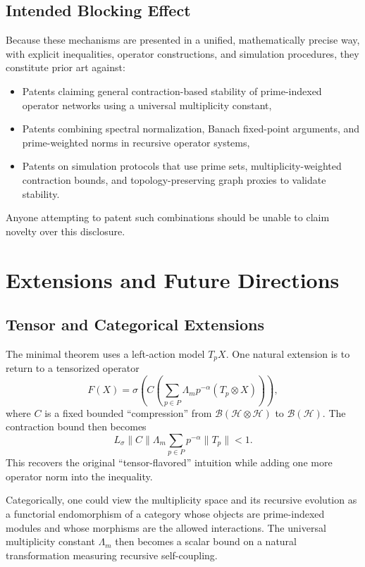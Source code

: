 \documentclass[12pt]{article}
\begin{document}
\subsection{Intended Blocking Effect}

Because these mechanisms are presented in a unified, mathematically precise way, with explicit inequalities, operator constructions, and simulation procedures, they constitute prior art against:

\begin{itemize}
  \item Patents claiming general contraction-based stability of prime-indexed operator networks using a universal multiplicity constant,
  \item Patents combining spectral normalization, Banach fixed-point arguments, and prime-weighted norms in recursive operator systems,
  \item Patents on simulation protocols that use prime sets, multiplicity-weighted contraction bounds, and topology-preserving graph proxies to validate stability.
\end{itemize}

Anyone attempting to patent such combinations should be unable to claim novelty over this disclosure.

\section{Extensions and Future Directions}

\subsection{Tensor and Categorical Extensions}

The minimal theorem uses a left-action model \(T_p X\). One natural extension is to return to a tensorized operator
\[
  F(X) = \sigma\!\left( C\!\left(\sum_{p\in P} \Lambda_m p^{-\alpha}(T_p \otimes X)\right)\right),
\]
where \(C\) is a fixed bounded ``compression'' from \(\mathcal{B}(\mathcal{H}\otimes\mathcal{H})\) to \(\mathcal{B}(\mathcal{H})\). The contraction bound then becomes
\[
  L_\sigma \|C\| \Lambda_m \sum_{p\in P} p^{-\alpha} \|T_p\| < 1.
\]
This recovers the original ``tensor-flavored'' intuition while adding one more operator norm into the inequality.

Categorically, one could view the multiplicity space and its recursive evolution as a functorial endomorphism of a category whose objects are prime-indexed modules and whose morphisms are the allowed interactions. The universal multiplicity constant \(\Lambda_m\) then becomes a scalar bound on a natural transformation measuring recursive self-coupling.
\end{document}
